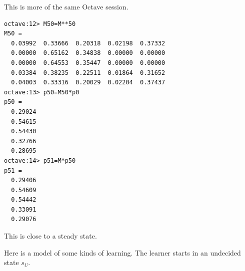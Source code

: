 \begin{exercises}
\begin{answer}
\begin{exparts}
\begin{center}
       \end{center} 
        \partsitem This is more of the same Octave session.
\begin{lstlisting}
octave:12> M50=M**50
M50 =
  0.03992  0.33666  0.20318  0.02198  0.37332
  0.00000  0.65162  0.34838  0.00000  0.00000
  0.00000  0.64553  0.35447  0.00000  0.00000
  0.03384  0.38235  0.22511  0.01864  0.31652
  0.04003  0.33316  0.20029  0.02204  0.37437
octave:13> p50=M50*p0
p50 =
  0.29024
  0.54615
  0.54430
  0.32766
  0.28695
octave:14> p51=M*p50
p51 =
  0.29406
  0.54609
  0.54442
  0.33091
  0.29076
\end{lstlisting}
        This is close to a steady state.
      \end{exparts}
    \end{answer}
  \item 
    \cite{Wickens} %
    Here is a  model of some kinds of learning.
    The learner starts in an undecided state $s_U$.

\end{exercises}
